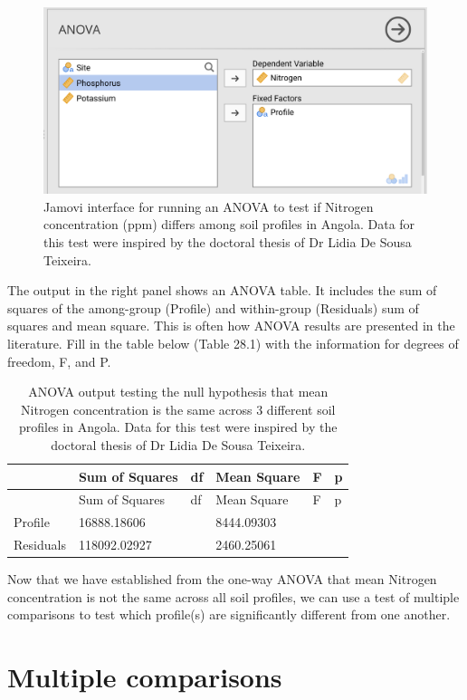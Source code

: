 \documentclass[
  openany]{scrbook}
\begin{document}
\begin{figure}
\includegraphics[width=1\linewidth]{img/jamovi_ANOVA_input} \caption{Jamovi interface for running an ANOVA to test if Nitrogen concentration (ppm) differs among soil profiles in Angola. Data for this test were inspired by the doctoral thesis of Dr Lidia De Sousa Teixeira.}\label{fig:unnamed-chunk-113}
\end{figure}

The output in the right panel shows an ANOVA table.
It includes the sum of squares of the among-group (Profile) and within-group (Residuals) sum of squares and mean square.
This is often how ANOVA results are presented in the literature.
Fill in the table below (Table 28.1) with the information for degrees of freedom, F, and P.

\begin{longtable}[]{@{}llllll@{}}
\caption{\label{tab:unnamed-chunk-114}ANOVA output testing the null hypothesis that mean Nitrogen concentration is the same across 3 different soil profiles in Angola. Data for this test were inspired by the doctoral thesis of Dr Lidia De Sousa Teixeira.}\tabularnewline
\toprule
& Sum of Squares & df & Mean Square & F & p \\
\midrule
\endfirsthead
\toprule
& Sum of Squares & df & Mean Square & F & p \\
\midrule
\endhead
Profile & 16888.18606 & & 8444.09303 & & \\
Residuals & 118092.02927 & & 2460.25061 & & \\
\bottomrule
\end{longtable}

Now that we have established from the one-way ANOVA that mean Nitrogen concentration is not the same across all soil profiles, we can use a test of multiple comparisons to test which profile(s) are significantly different from one another.

\hypertarget{multiple-comparisons}{%
\section{Multiple comparisons}\label{multiple-comparisons}}
\end{document}

